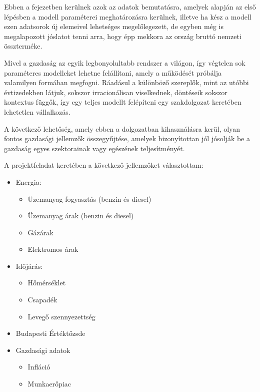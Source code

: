 Ebben a fejezetben kerülnek azok az adatok bemutatásra, amelyek alapján az első lépésben a modell
paraméterei meghatározásra kerülnek, illetve ha kész a modell ezen adatsorok új elemeivel
lehetséges megelőlegezett, de egyben még is megalapozott jóslatot tenni arra, hogy épp mekkora az
ország bruttó nemzeti összterméke.

Mivel a gazdaság az egyik legbonyolultabb rendszer a világon, így végtelen sok paraméteres
modelleket lehetne felállítani, amely a működését próbálja valamilyen formában megfogni. Ráadásul a
különböző szereplők, mint az utóbbi évtizedekben látjuk, sokszor irracionálisan viselkednek,
döntéseik sokszor kontextus függők, így egy teljes modellt felépíteni egy szakdolgozat keretében
lehetetlen vállalkozás.

A következő lehetőség, amely ebben a dolgozatban kihasználásra kerül, olyan fontos gazdasági
jellemzők összegyűjtése, amelyek bizonyítottan jól jósolják be a gazdaság egyes szektorainak vagy
egészének teljesítményét.

A projektfeladat keretében a következő jellemzőket választottam:

\begin{itemize}
    \item Energia:
          \begin{itemize}
              \item Üzemanyag fogyasztás (benzin és diesel)
              \item Üzemanyag árak (benzin és diesel)
              \item Gázárak
              \item Elektromos árak
          \end{itemize}
    \item Időjárás:
          \begin{itemize}
              \item Hőmérséklet
              \item Csapadék
              \item Levegő szennyezettség
          \end{itemize}
    \item Budapesti Értéktőzsde
    \item Gazdasági adatok
          \begin{itemize}
              \item Infláció
              \item Munkaerőpiac
          \end{itemize}
\end{itemize}

